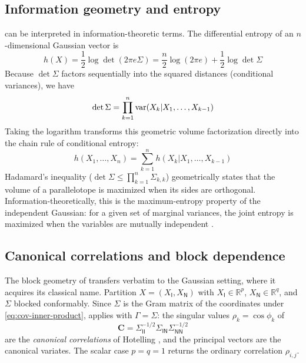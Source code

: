 \documentclass{IEEEtran}
\begin{document}
\subsection{Information geometry and entropy}\label{subsec:entropy}

 can be interpreted in information-theoretic terms. The differential entropy of an $n$-dimensional Gaussian vector is
\begin{equation*}
  h(X)
  = \frac{1}{2} \log\det(2\pi e \Sigma)
  = \frac{n}{2} \log(2\pi e) + \frac{1}{2} \log\det\Sigma
\end{equation*}
Because $\det \Sigma$ factors sequentially into the squared distances (conditional variances), we have
\begin{equation*}
  \det \Sigma = \prod_{k=1}^{n} \operatorname{var}(X_{k} | X_{1}, \ldots, X_{k-1})
\end{equation*}
Taking the logarithm transforms this geometric volume factorization directly into the chain rule of conditional entropy:
\begin{equation*}
  h(X_{1}, \ldots, X_{n}) = \sum_{k=1}^{n} h(X_{k} | X_{1}, \ldots, X_{k-1})
\end{equation*}
Hadamard's inequality ($\det \Sigma \le \prod_{k=1}^{n} \Sigma_{k,k}$) geometrically states that the volume of a parallelotope is maximized when its sides are orthogonal. Information-theoretically, this is the maximum-entropy property of the independent Gaussian: for a given set of marginal variances, the joint entropy is maximized when the variables are mutually independent \cite[Ch.~8]{cover2006}.

\subsection{Canonical correlations and block dependence}\label{subsec:canonical-gaussian}

The block geometry of  transfers verbatim to the Gaussian setting, where it acquires its classical name. Partition $X = (X_{\mathsf{I}}, X_{\mathsf{N}})$ with $X_{\mathsf{I}}\in\mathbb{R}^{p}$, $X_{\mathsf{N}}\in\mathbb{R}^{q}$, and $\Sigma$ blocked conformably. Since $\Sigma$ is the Gram matrix of the coordinates under \eqref{eq:cov-inner-product},  applies with $\Gamma = \Sigma$: the singular values $\rho_{k}=\cos\phi_{k}$ of
\begin{equation}
  \mathbf{C} = \Sigma_{\mathsf{II}}^{-1/2}\Sigma_{\mathsf{IN}}\Sigma_{\mathsf{NN}}^{-1/2}
  \label{eq:canonical-cross}
\end{equation}
are the \emph{canonical correlations} of Hotelling \cite{hotelling1936}, and the principal vectors are the canonical variates. The scalar case $p=q=1$ returns the ordinary correlation $\rho_{i,j}$.
\end{document}
